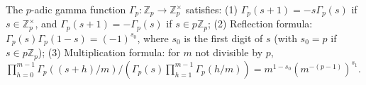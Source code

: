 The $p$-adic gamma function $\Gamma_p: \mathbb{Z}_p \to \mathbb{Z}_p^\times$ satisfies:
(1) $\Gamma_p(s+1) = -s\Gamma_p(s)$ if $s \in \mathbb{Z}_p^\times$, and $\Gamma_p(s+1) = -\Gamma_p(s)$ if $s \in p\mathbb{Z}_p$;
(2) Reflection formula: $\Gamma_p(s)\Gamma_p(1-s) = (-1)^{s_0}$, where $s_0$ is the first digit of $s$ (with $s_0 = p$ if $s \in p\mathbb{Z}_p$);
(3) Multiplication formula: for $m$ not divisible by $p$, $\prod_{h=0}^{m-1} \Gamma_p((s+h)/m) / (\Gamma_p(s)\prod_{h=1}^{m-1}\Gamma_p(h/m)) = m^{1-s_0}(m^{-(p-1)})^{s_1}$.
